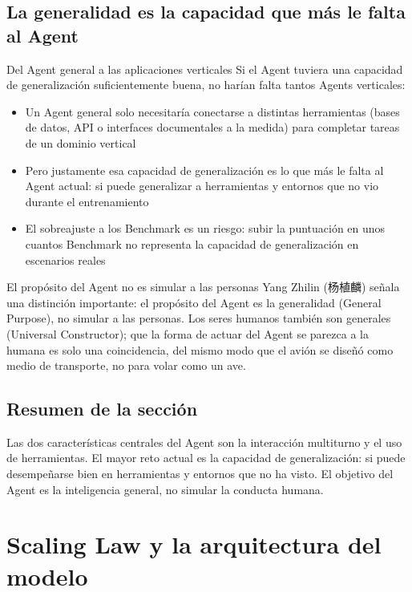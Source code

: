 \documentclass[a4paper]{article}
\begin{document}
\subsection{La generalidad es la capacidad que más le falta al Agent}

\begin{importantbox}{Del Agent general a las aplicaciones verticales}
Si el Agent tuviera una capacidad de generalización suficientemente buena, no harían falta tantos Agents verticales:
\begin{itemize}
    \item Un Agent general solo necesitaría conectarse a distintas herramientas (bases de datos, API o interfaces documentales a la medida) para completar tareas de un dominio vertical
    \item Pero justamente esa capacidad de generalización es lo que más le falta al Agent actual: si puede generalizar a herramientas y entornos que no vio durante el entrenamiento
    \item El sobreajuste a los Benchmark es un riesgo: subir la puntuación en unos cuantos Benchmark no representa la capacidad de generalización en escenarios reales
\end{itemize}
\end{importantbox}

\begin{knowledgebox}{El propósito del Agent no es simular a las personas}
Yang Zhilin (杨植麟) señala una distinción importante: el propósito del Agent es la generalidad (General Purpose), no simular a las personas. Los seres humanos también son generales (Universal Constructor); que la forma de actuar del Agent se parezca a la humana es solo una coincidencia, del mismo modo que el avión se diseñó como medio de transporte, no para volar como un ave.
\end{knowledgebox}

\subsection{Resumen de la sección}

Las dos características centrales del Agent son la interacción multiturno y el uso de herramientas. El mayor reto actual es la capacidad de generalización: si puede desempeñarse bien en herramientas y entornos que no ha visto. El objetivo del Agent es la inteligencia general, no simular la conducta humana.

\section{Scaling Law y la arquitectura del modelo}
\end{document}

